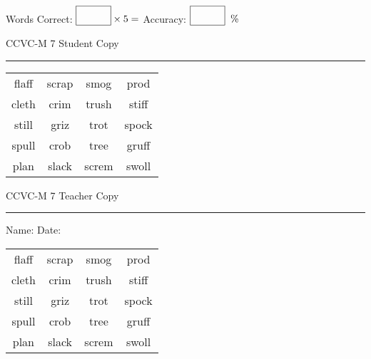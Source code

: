 \documentclass{memoir}
\begin{document}
\small

Words Correct: $\fbox{\phantom{\huge 100}} \times 5 = $ Accuracy: $\fbox{\phantom{\huge 100}}\;\; \%$ 

\vfill

\newpage


\footnotesize \noindent
CCVC-M 7 \hfill Student Copy
\smallskip
\hrule

\Large

\setlength{\tabcolsep}{14pt}
\def\arraystretch{3}

{\selectfont


\begin{vplace}[0.5]
\begin{center}
\begin{tabular}{cccc}
flaff & scrap & smog & prod \\
cleth & crim & trush & stiff \\
still & griz & trot & spock \\
spull & crob & tree & gruff \\
plan & slack            & screm & swoll \\
\end{tabular}
\end{center}
\end{vplace}

}

\newpage

\footnotesize \noindent
CCVC-M 7 \hfill Teacher Copy
\smallskip
\hrule

\small

\vfill

\noindent
Name: \underline{\hspace{1.75in}} \hfill Date: \underline{\hspace{1in}}

\Large

{\selectfont


\begin{vplace}[0.5]
\begin{center}
\begin{tabular}{cccc}
flaff & scrap & smog & prod \\
cleth & crim & trush & stiff \\
still & griz & trot & spock \\
spull & crob & tree & gruff \\
plan & slack            & screm & swoll \\
\end{tabular}
\end{center}
\end{vplace}



}
\end{document}
